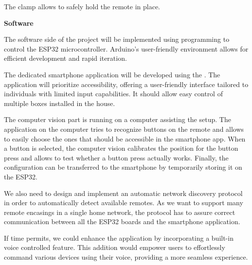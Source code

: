 \begin{minipage}[t]{0.5\textwidth}
    \vspace{5mm}
    The clamp allows to safely hold the remote in place.
\end{minipage}
\begin{minipage}[t]{0.45\textwidth}
    \centering{}
\end{minipage}\hfill

\textbf{Software}

The software side of the project will be implemented using  programming to control the ESP32 microcontroller.
Arduino's user-friendly environment allows for efficient development and rapid iteration.

The dedicated smartphone application will be developed using the .
The application will prioritize accessibility, offering a user-friendly interface tailored to individuals with limited input capabilities.
It should allow easy control of multiple boxes installed in the house.

The computer vision part is running on a computer assisting the setup. 
The application on the computer tries to recognize buttons on the remote and allows to easily choose the ones that should be accessible in the smartphone app.
When a button is selected, the computer vision calibrates the position for the button press and allows to test whether a button press actually works.
Finally, the configuration can be transferred to the smartphone by temporarily storing it on the ESP32.

We also need to design and implement an automatic network discovery protocol in order to automatically detect available remotes.
As we want to support many remote encasings in a single home network, the protocol has to assure correct communication between all the ESP32 boards and the smartphone application.

If time permits, we could enhance the application by incorporating a built-in voice controlled feature.
This addition would empower users to effortlessly command various devices using their voice, providing a more seamless experience.
